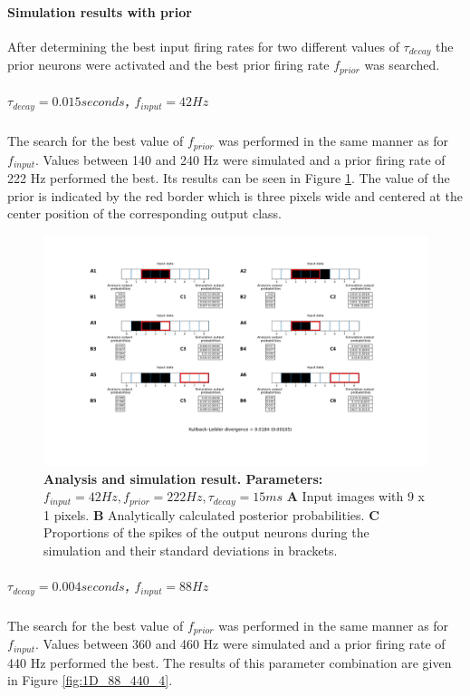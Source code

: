 \paragraph{Simulation results with prior}
After determining the best input firing rates for two different values of $\tau_{decay}$ the prior neurons were activated and the best prior firing rate $f_{prior}$ was searched.
\subparagraph{$\tau_{decay} = 0.015 seconds$, $f_{input} = 42 Hz$}
The search for the best value of $f_{prior}$ was performed in the same manner as for $f_{input}$. Values between 140 and 240 Hz were simulated and a prior firing rate of 222 Hz performed the best. Its results can be seen in Figure \ref{fig:1D_42_222_15}. The value of the prior is indicated by the red border which is three pixels wide and centered at the center position of the corresponding output class.

\begin{figure}
  \includegraphics[width=\linewidth]{figures/1D/1D_42_222_15.png}
  \caption{\textbf{Analysis and simulation result. Parameters: } $f_{input} = 42 Hz, f_{prior} = 222 Hz, \tau_{decay} = 15 ms$ \textbf{A} Input images with 9 x 1 pixels. \textbf{B} Analytically calculated posterior probabilities. \textbf{C} Proportions of the spikes of the output neurons during the simulation and their standard deviations in brackets.}
  \label{fig:1D_42_222_15}
\end{figure}

\subparagraph{$\tau_{decay} = 0.004 seconds$, $f_{input} = 88 Hz$}
The search for the best value of $f_{prior}$ was performed in the same manner as for $f_{input}$. Values between 360 and 460 Hz were simulated and a prior firing rate of 440 Hz performed the best. The results of this parameter combination are given in Figure \ref{fig:1D_88_440_4}.

